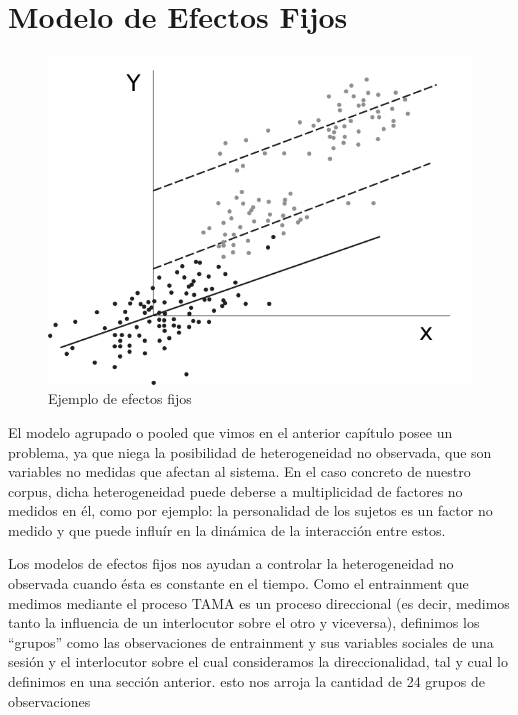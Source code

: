 \section{Modelo de Efectos Fijos}

\begin{figure}[t]
\centering
\includegraphics[scale=1]{images/fixed_effects_example.pdf}
\caption{Ejemplo de efectos fijos}
\label{fig:efectos_fijo}
\end{figure}



\newcommand{\slopeestim}[1] { $\estslope \sim #1$ }

El modelo agrupado o pooled que vimos en el anterior capítulo posee un problema, ya que niega la posibilidad de heterogeneidad no observada, que son variables no medidas que afectan al sistema. En el caso concreto de nuestro corpus, dicha heterogeneidad puede deberse a multiplicidad de factores no medidos en él, como por ejemplo: la personalidad de los sujetos es un factor no medido y que puede influír en la dinámica de la interacción entre estos.

Los modelos de efectos fijos nos ayudan a controlar la heterogeneidad no observada cuando ésta es constante en el tiempo.
Como el entrainment que medimos mediante el proceso TAMA es un proceso direccional (es decir, medimos tanto la influencia de un interlocutor sobre el otro y viceversa), definimos los ``grupos'' como las observaciones de entrainment y sus variables sociales de una sesión y el interlocutor sobre el cual consideramos la direccionalidad, tal y cual lo definimos en una sección anterior. esto nos arroja la cantidad de 24 grupos de observaciones



